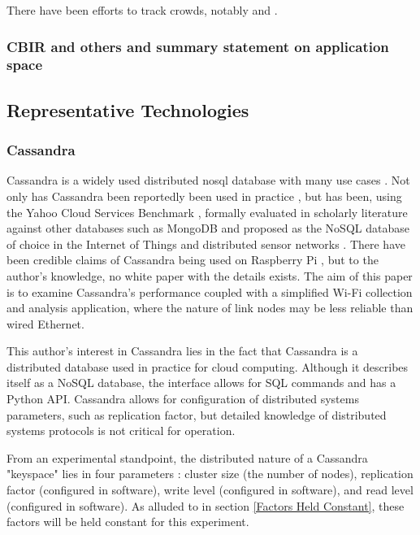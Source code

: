 There have been efforts to track crowds, notably \cite{Bonne2013WiFiPi:Events} and \cite{Schauer2014EstimatingBluetooth}.  
\subsubsection{CBIR and others and summary statement on application space}


\subsection{Representative Technologies}

\subsubsection{Cassandra}
\label{Cassandra}
Cassandra is a widely used distributed \gls{nosql} database with many use cases \cite{Lakshman2010CassandraSystem}.
Not only has Cassandra been reportedly been used in practice \cite{ApacheCases}, but has been, using the Yahoo Cloud Services Benchmark \cite{YahooBenchmark}, formally evaluated in scholarly literature against other databases such as MongoDB and proposed as the NoSQL database of choice in the Internet of Things and distributed sensor networks \cite{Abramova2013NoSQLCassandra}.
There have been credible claims of Cassandra being used on Raspberry Pi \cite{VanRyswykMulti-DatacenterPis,SercelCassandraMedium}, but to the author's knowledge, no white paper with the details exists.
The aim of this paper is to examine Cassandra's performance coupled with a simplified Wi-Fi collection and analysis application, where the nature of link nodes may be less reliable than wired Ethernet.

This author's interest in Cassandra lies in the fact that Cassandra is a distributed database used in practice for cloud computing.
Although it describes itself as a NoSQL database, the interface allows for SQL commands and has a Python API.
Cassandra allows for configuration of distributed systems parameters, such as replication factor, but detailed knowledge of distributed systems protocols is not critical for operation.

From an experimental standpoint, the distributed nature of a Cassandra "keyspace" lies in four parameters \cite{CassandraDummies}: cluster size (the number of nodes), replication factor (configured in software), write level (configured in software), and read level (configured in software).
As alluded to in section \ref{Factors Held Constant}, these factors will be held constant for this experiment.

